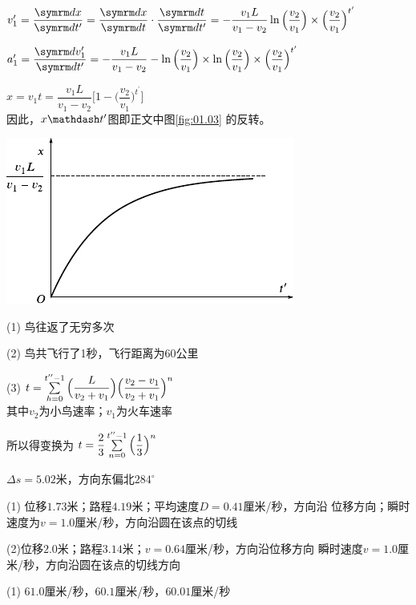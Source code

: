 \achapter

\answer $v_{1}^{\prime}=\dfrac{\dif x}{\dif t^{\prime}}=\dfrac{\dif x}{\dif t} \cdot \dfrac{\dif t}{\dif t^{\prime}}=-\dfrac{v_{1} L}{v_{1}-v_{2}} \ln \Big(\dfrac{v_{2}}{v_{1}}\Big) \times\Big(\dfrac{v_{2}}{v_{1}}\Big)^{t^{\prime}}$

$a_{1}^{\prime}=\dfrac{\dif v_{1}^{\prime}}{\dif t^{\prime}}=-\dfrac{v_{1} L}{v_{1}-v_{2}}-\ln \Big(\dfrac{v_{2}}{v_{1}}\Big) \times \ln \Big(\dfrac{v_{2}}{v_{1}}\Big) \times\Big(\dfrac{v_{2}}{v_{1}}\Big)^{t^{\prime}} $

$x=v_{1} t=\dfrac{v_{1} L}{v_{1}-v_{2}}\Big[1-\Big(\dfrac{v_{2}}{v_{1}}\Big)^{t^{\prime}}\Big]$\\
因此，$ x\mathdash t'$图即正文中图\ref{fig:01.03} 的反转。
\begin{figurex}
    \centering
    \includegraphics{figure/figa01.01}
    \caption{}
    \label{figa:01.01}
\end{figurex}

\answer (1) 鸟往返了无穷多次

(2) 鸟共飞行了1秒，飞行距离为60公里

(3) $t=\textstyle\sum\limits_{h=0}^{t''-1}  \Big(\dfrac{L}{v_{2}+v_{1}}\Big)\Big(\dfrac{v_{2}-v_{1}}{v_{2}+v_{1}}\Big)^{n}$\\
其中$ v_2 $为小鸟速率；$ v_1 $为火车速率

所以得变换为
$    t=\dfrac{2}{3} \textstyle\sum\limits_{n=0}^{t'' -1}\Big(\dfrac{1}{3}\Big)^{n}$

\answer $ \Delta s = 5 . 0 2   $米，方向东偏北$ 284^{\circ} $

\answer (1) 位移$ 1.73 $米；路程$ 4.19 $米；平均速度$ D=0.41 $厘米/秒，方向沿
位移方向；瞬时速度为$ v=1.0$厘米/秒，方向沿圆在该点的切线

(2)位移$ 2.0 $米；路程$ 3.14 $米；$ v = 0.64 $厘米/秒，方向沿位移方向
瞬时速度$  v = 1.0 $厘米/秒，方向沿圆在该点的切线方向

\answer (1) $ 61.0 $厘米/秒，$ 60.1 $厘米/秒，$ 60.01 $厘米/秒

